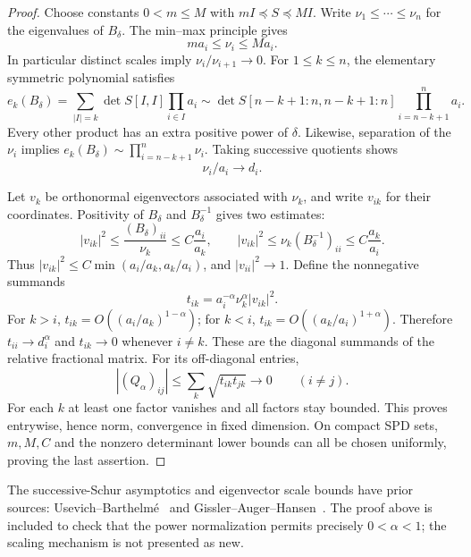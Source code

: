 \begin{proof}
Choose constants $0<m\le M$ with $mI\preceq S\preceq MI$.
Write $\nu_1\le\cdots\le\nu_n$ for the eigenvalues of $B_\delta$.
The min--max principle gives
\[
 ma_i\le\nu_i\le Ma_i.
\]
In particular distinct scales imply $\nu_i/\nu_{i+1}\to0$.
For $1\le k\le n$, the elementary symmetric polynomial satisfies
\[
 e_k(B_\delta)
 =\sum_{|I|=k}\det S[I,I]\prod_{i\in I}a_i
 \sim\det S[n-k+1:n,n-k+1:n]\prod_{i=n-k+1}^n a_i.
\]
Every other product has an extra positive power of $\delta$.
Likewise, separation of the $\nu_i$ implies
$e_k(B_\delta)\sim\prod_{i=n-k+1}^n\nu_i$.
Taking successive quotients shows
\[
 \nu_i/a_i\longrightarrow d_i.
\]

Let $v_k$ be orthonormal eigenvectors associated with $\nu_k$,
and write $v_{ik}$ for their coordinates. Positivity of $B_\delta$
and $B_\delta^{-1}$ gives two estimates:
\[
 |v_{ik}|^2\le\frac{(B_\delta)_{ii}}{\nu_k}
 \le C\frac{a_i}{a_k},\qquad
 |v_{ik}|^2\le\nu_k(B_\delta^{-1})_{ii}
 \le C\frac{a_k}{a_i}.
\]
Thus $|v_{ik}|^2\le C\min(a_i/a_k,a_k/a_i)$, and
$|v_{ii}|^2\to1$. Define the nonnegative summands
\[
 t_{ik}=a_i^{-\alpha}\nu_k^\alpha|v_{ik}|^2.
\]
For $k>i$, $t_{ik}=O((a_i/a_k)^{1-\alpha})$; for $k<i$,
$t_{ik}=O((a_k/a_i)^{1+\alpha})$. Therefore
$t_{ii}\to d_i^\alpha$ and $t_{ik}\to0$ whenever $i\ne k$.
These are the diagonal summands of the relative fractional matrix.
For its off-diagonal entries,
\[
 |(Q_\alpha)_{ij}|\le\sum_k\sqrt{t_{ik}t_{jk}}\to0
 \qquad(i\ne j).
\]
For each $k$ at least one factor vanishes and all factors stay bounded.
This proves entrywise, hence norm, convergence in fixed dimension.
On compact SPD sets, $m,M,C$ and the nonzero determinant lower bounds
can all be chosen uniformly, proving the last assertion.
\end{proof}

The successive-Schur asymptotics and eigenvector scale bounds have prior
sources: Usevich--Barthelm\'e~\cite[Theorem 4.2 in the arXiv v2 PDF]{UB} and
Gissler--Auger--Hansen~\cite[Theorem 1]{GAH}. The proof above is included
to check that the power normalization permits precisely $0<\alpha<1$;
the scaling mechanism is not presented as new.

